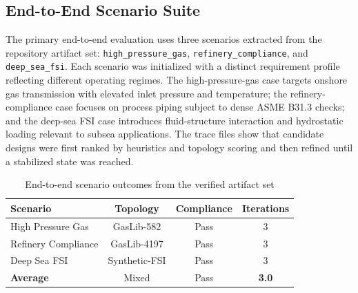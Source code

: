\documentclass[conference]{IEEEtran}
\begin{document}
\subsection{End-to-End Scenario Suite}

The primary end-to-end evaluation uses three scenarios extracted from the repository artifact set: \texttt{high\_pressure\_gas}, \texttt{refinery\_compliance}, and \texttt{deep\_sea\_fsi}. Each scenario was initialized with a distinct requirement profile reflecting different operating regimes. The high-pressure-gas case targets onshore gas transmission with elevated inlet pressure and temperature; the refinery-compliance case focuses on process piping subject to dense ASME B31.3 checks; and the deep-sea FSI case introduces fluid-structure interaction and hydrostatic loading relevant to subsea applications. The trace files show that candidate designs were first ranked by heuristics and topology scoring and then refined until a stabilized state was reached.
 
\begin{table}[!t]

\caption{End-to-end scenario outcomes from the verified artifact set}

\label{tab:scenario_suite}

\centering

\setlength{\tabcolsep}{4pt}

\begin{tabular}{lccc}

\toprule

\textbf{Scenario} & \textbf{Topology} & \textbf{Compliance} & \textbf{Iterations} \\

\midrule

High Pressure Gas    & GasLib-582    & Pass & 3 \\

Refinery Compliance  & GasLib-4197   & Pass & 3 \\

Deep Sea FSI         & Synthetic-FSI & Pass & 3 \\

\midrule

\textbf{Average}     & Mixed            & Pass & \textbf{3.0} \\

\bottomrule

\end{tabular}

\end{table}
 
\end{document}
